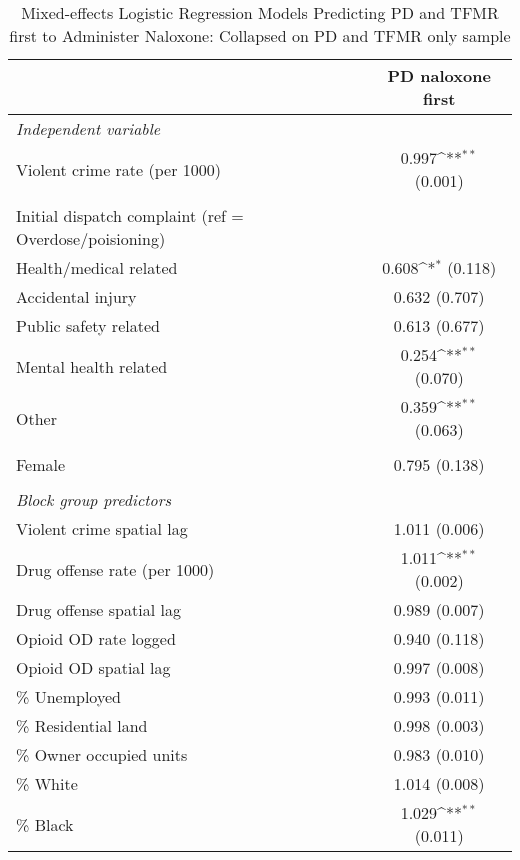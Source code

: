 \begin{table}[htbp]\centering
\def\sym#1{\ifmmode^{#1}\else\(^{#1}\)\fi}
\caption{Mixed-effects Logistic Regression Models Predicting PD and TFMR first to Administer Naloxone: Collapsed on PD and TFMR only sample}
\begin{adjustbox}{max width=\linewidth}\begin{tabular}{l*{1}{c}}
\toprule
                &\multicolumn{1}{c}{PD naloxone first}\\
\midrule
\emph{Independent variable}&                 \\
Violent crime rate (per 1000)&0.997\sym{**} (0.001)        \\
\vspace{.05em} \\
Initial dispatch complaint (ref = Overdose/poisioning)&                 \\
Health/medical related&0.608\sym{*} (0.118)        \\
Accidental injury&0.632 (0.707)        \\
Public safety related&0.613 (0.677)        \\
Mental health related&0.254\sym{**} (0.070)        \\
Other           &0.359\sym{**} (0.063)        \\
\vspace{.05em} \\
Female          &0.795 (0.138)        \\
\vspace{.05em} \\
\emph{Block group predictors}&                 \\
Violent crime spatial lag&1.011 (0.006)        \\
Drug offense rate (per 1000)&1.011\sym{**} (0.002)        \\
Drug offense spatial lag&0.989 (0.007)        \\
Opioid OD rate logged&0.940 (0.118)        \\
Opioid OD spatial lag&0.997 (0.008)        \\
\% Unemployed   &0.993 (0.011)        \\
\% Residential land&0.998 (0.003)        \\
\% Owner occupied units&0.983 (0.010)        \\
\% White        &1.014 (0.008)        \\
\% Black        &1.029\sym{**} (0.011)        \\

\end{tabular}
\end{adjustbox}
\end{table}
